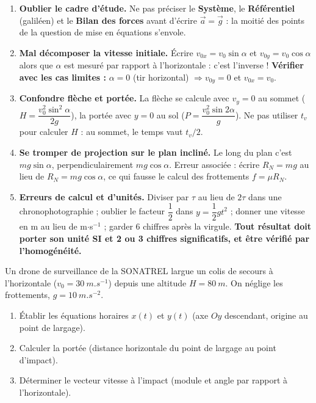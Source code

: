 \documentclass[11pt]{article}
\begin{document}
\begin{attention}
\begin{enumerate}
\item \textbf{Oublier le cadre d'étude.} Ne pas préciser le \textbf{Système}, le \textbf{Référentiel} (galiléen) et le \textbf{Bilan des forces} avant d'écrire $\vec{a}=\vec{g}$ : la moitié des points de la question de mise en équations s'envole.
\item \textbf{Mal décomposer la vitesse initiale.} Écrire $v_{0x}=v_0\sin\alpha$ et $v_{0y}=v_0\cos\alpha$ alors que $\alpha$ est mesuré par rapport à l'horizontale : c'est l'inverse ! \textbf{Vérifier avec les cas limites :} $\alpha=0$ (tir horizontal) $\Rightarrow v_{0y}=0$ et $v_{0x}=v_0$.
\item \textbf{Confondre flèche et portée.} La flèche se calcule avec $v_y=0$ au sommet ($H=\dfrac{v_0^2\sin^2\alpha}{2g}$), la portée avec $y=0$ au sol ($P=\dfrac{v_0^2\sin 2\alpha}{g}$). Ne pas utiliser $t_v$ pour calculer $H$ : au sommet, le temps vaut $t_v/2$.
\item \textbf{Se tromper de projection sur le plan incliné.} Le long du plan c'est $mg\sin\alpha$, perpendiculairement $mg\cos\alpha$. Erreur associée : écrire $R_N=mg$ au lieu de $R_N=mg\cos\alpha$, ce qui fausse le calcul des frottements $f=\mu R_N$.
\item \textbf{Erreurs de calcul et d'unités.} Diviser par $\tau$ au lieu de $2\tau$ dans une chronophotographie ; oublier le facteur $\dfrac{1}{2}$ dans $y=\dfrac{1}{2}gt^2$ ; donner une vitesse en m au lieu de m$\cdot$s$^{-1}$ ; garder 6 chiffres après la virgule. \textbf{Tout résultat doit porter son unité SI et 2 ou 3 chiffres significatifs, et être vérifié par l'homogénéité.}
\end{enumerate}
\end{attention}

\begin{exercice}
Un drone de surveillance de la SONATREL largue un colis de secours à l'horizontale ($v_0=\SI{30}{m.s^{-1}}$) depuis une altitude $H=\SI{80}{m}$. On néglige les frottements, $g=\SI{10}{m.s^{-2}}$.
\begin{enumerate}
\item Établir les équations horaires $x(t)$ et $y(t)$ (axe $Oy$ descendant, origine au point de largage).
\item Calculer la portée (distance horizontale du point de largage au point d'impact).
\item Déterminer le vecteur vitesse à l'impact (module et angle par rapport à l'horizontale).
\end{enumerate}
\end{exercice}
\end{document}

